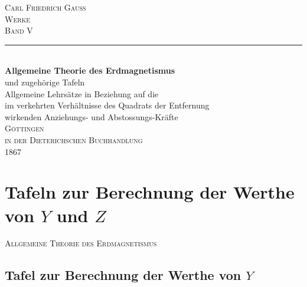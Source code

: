 \documentclass[12pt,a4paper]{article}
\begin{document}
\begin{titlepage}
\centering
\vspace*{3cm}
{\Huge\scshape Carl Friedrich Gauß\\[0.5em] Werke}\\[1cm]
{\LARGE\scshape Band V}\\[0.3cm]
\rule{0.6\textwidth}{0.5pt}\\[1cm]
{\Large\bfseries Allgemeine Theorie des Erdmagnetismus}\\[0.3cm]
{\large und zugehörige Tafeln\\[0.5cm]
Allgemeine Lehrsätze in Beziehung auf die\\im verkehrten Verhältnisse des Quadrats der Entfernung\\wirkenden Anziehungs- und Abstossungs-Kräfte}\\[2cm]
{\large\scshape Göttingen\\in der Dieterichschen Buchhandlung}\\[0.3cm]
{\large 1867}
\vfill
\end{titlepage}

\tableofcontents
\newpage

\section*{Tafeln zur Berechnung der Werthe von $Y$ und $Z$}

\begin{center}
{\scshape Allgemeine Theorie des Erdmagnetismus}
\end{center}

\subsection*{Tafel zur Berechnung der Werthe von $Y$}
\end{document}
